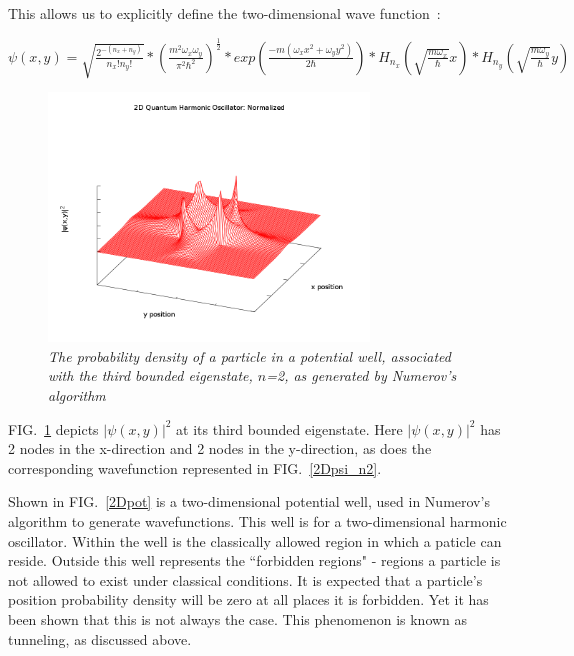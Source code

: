 \documentclass[aps,prl,twocolumn,superscriptaddress]{revtex4-1}
\begin{document}
This allows us to explicitly define the two-dimensional wave function~\cite{mathjournal}:
\begin{center}
$\psi(x,y) = \sqrt{\frac{2^{-(n_{x}+n_{y})}}{n_{x}!n_{y}!}} * (\frac{m^{2}\omega_{x}\omega_{y}}{\pi^{2}\hbar^{2}})^{\frac{1}{2}} * exp({\frac{-m(\omega_{x}x^{2} + \omega_{y}y^{2})}{2\hbar}}) * H_{n_{x}}(\sqrt{\frac{m\omega_x}{\hbar}}x) * H_{n_{y}}(\sqrt{\frac{m\omega_y}{\hbar}}y)$
\end{center}
\newpage
\begin{figure}[htb!]
  \begin{center}
\centerline{\includegraphics[width=3.35in]{2D_psisquared.png}}
\caption{\it \small{The probability density of a particle in a potential well, associated with the third bounded eigenstate, $n$=2, as generated by Numerov's algorithm \label{2Dpsi2_n2}}}
  \end{center}
\end{figure}

FIG.~\ref{2Dpsi2_n2} depicts $|\psi(x,y)|^2$ at its third bounded eigenstate.  Here $|\psi(x,y)|^2$ has 2 nodes in the x-direction
and 2 nodes in the y-direction, as does the corresponding wavefunction represented in FIG.~\ref{2Dpsi_n2}.




Shown in FIG.~\ref{2Dpot} is a two-dimensional potential well, used in Numerov's algorithm to generate wavefunctions.  This well is for a two-dimensional 
harmonic oscillator.  Within the well is the classically allowed region in which a paticle can reside.  Outside this well 
represents the ``forbidden regions" - regions a particle is not allowed to exist under classical conditions.  It is expected 
that a particle's position probability density will be zero at all places it is forbidden.  Yet it has been shown that this 
is not always the case.  This phenomenon is known as tunneling, as discussed above.
 
\end{document}
